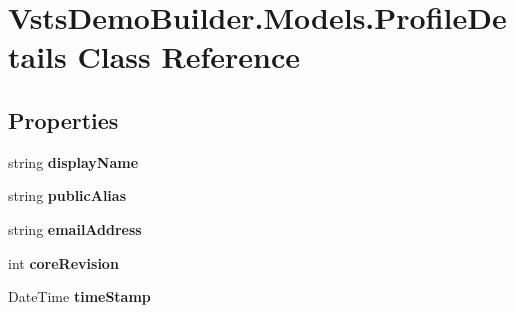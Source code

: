 \hypertarget{class_vsts_demo_builder_1_1_models_1_1_profile_details}{}\section{Vsts\+Demo\+Builder.\+Models.\+Profile\+Details Class Reference}
\label{class_vsts_demo_builder_1_1_models_1_1_profile_details}
\subsection*{Properties}
\begin{DoxyCompactItemize}
\item 
\mbox{\label{class_vsts_demo_builder_1_1_models_1_1_profile_details_a481185fb4c116a77d5f32f86a0967496}} 
string {\bfseries display\+Name}
\item 
\mbox{\label{class_vsts_demo_builder_1_1_models_1_1_profile_details_acd95115877450662df4cc1b5ecec8bd6}} 
string {\bfseries public\+Alias}
\item 
\mbox{\label{class_vsts_demo_builder_1_1_models_1_1_profile_details_af35ff9b7f1ad04f147321b9adc60cad0}} 
string {\bfseries email\+Address}
\item 
\mbox{\label{class_vsts_demo_builder_1_1_models_1_1_profile_details_a31ca994ce3fbb302d0754eed7e40a0d4}} 
int {\bfseries core\+Revision}
\item 
\mbox{\label{class_vsts_demo_builder_1_1_models_1_1_profile_details_a66296d3b10d96a433e9e47facebd1897}} 
Date\+Time {\bfseries time\+Stamp}

\end{DoxyCompactItemize}
